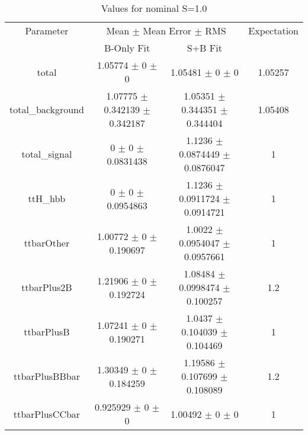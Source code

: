 \begin{table}
\centering
\caption{Values for nominal S=1.0}
\begin{tabular}{cccc}
\toprule
Parameter & \multicolumn{2}{c}{Mean $\pm$ Mean Error $\pm$ RMS} & Expectation\\
 & B-Only Fit & S+B Fit & \\
\midrule
total & \num{1.05774} $\pm$ \num{0} $\pm$ \num{0} & \num{1.05481} $\pm$ \num{0} $\pm$ \num{0} & \num{1.05257}\\
total\_background & \num{1.07775} $\pm$ \num{0.342139} $\pm$ \num{0.342187} & \num{1.05351} $\pm$ \num{0.344351} $\pm$ \num{0.344404} & \num{1.05408}\\
total\_signal & \num{0} $\pm$ \num{0} $\pm$ \num{0.0831438} & \num{1.1236} $\pm$ \num{0.0874449} $\pm$ \num{0.0876047} & \num{1}\\
ttH\_hbb & \num{0} $\pm$ \num{0} $\pm$ \num{0.0954863} & \num{1.1236} $\pm$ \num{0.0911724} $\pm$ \num{0.0914721} & \num{1}\\
ttbarOther & \num{1.00772} $\pm$ \num{0} $\pm$ \num{0.190697} & \num{1.0022} $\pm$ \num{0.0954047} $\pm$ \num{0.0957661} & \num{1}\\
ttbarPlus2B & \num{1.21906} $\pm$ \num{0} $\pm$ \num{0.192724} & \num{1.08484} $\pm$ \num{0.0998474} $\pm$ \num{0.100257} & \num{1.2}\\
ttbarPlusB & \num{1.07241} $\pm$ \num{0} $\pm$ \num{0.190271} & \num{1.0437} $\pm$ \num{0.104039} $\pm$ \num{0.104469} & \num{1}\\
ttbarPlusBBbar & \num{1.30349} $\pm$ \num{0} $\pm$ \num{0.184259} & \num{1.19586} $\pm$ \num{0.107699} $\pm$ \num{0.108089} & \num{1.2}\\
ttbarPlusCCbar & \num{0.925929} $\pm$ \num{0} $\pm$ \num{0} & \num{1.00492} $\pm$ \num{0} $\pm$ \num{0} & \num{1}\\
\bottomrule
\end{tabular}
\end{table}